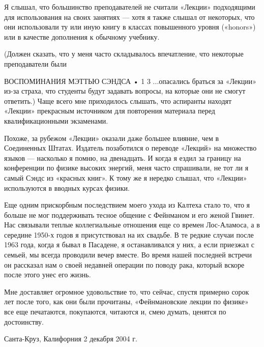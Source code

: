 \documentclass[10pt,oneside]{article}
\begin{document}
Я слышал, что большинство преподавателей не считали «Лекции» подходящими для использования на своих занятиях --- хотя я также слышал от некоторых, что они использовали ту или иную книгу в классах повышенного уровня («honors») или в качестве дополнения к обычному учебнику.\par

(Должен сказать, что у меня часто складывалось впечатление, что некоторые преподаватели были\par

ВОСПОМИНАНИЯ МЭТТЬЮ СЭНДСА • 1 3 ...опасались браться за «Лекции» из-за страха, что студенты будут задавать вопросы, на которые они не смогут ответить.) Чаще всего мне приходилось слышать, что аспиранты находят «Лекции» прекрасным источником для повторения материала перед квалификационными экзаменами.\par

Похоже, за рубежом «Лекции» оказали даже большее влияние, чем в Соединенных Штатах. Издатель позаботился о переводе «Лекций» на множество языков --- насколько я помню, на двенадцать. И когда я ездил за границу на конференции по физике высоких энергий, меня часто спрашивали, не тот ли я самый Сэндс из «красных книг». К тому же я нередко слышал, что «Лекции» используются в вводных курсах физики.\par

Еще одним прискорбным последствием моего ухода из Калтеха стало то, что я больше не мог поддерживать тесное общение с Фейнманом и его женой Гвинет. Нас связывали теплые коллегиальные отношения еще со времен Лос-Аламоса, а в середине 1950-х годов я присутствовал на их свадьбе. В те редкие случаи после 1963 года, когда я бывал в Пасадене, я останавливался у них, а если приезжал с семьей, мы всегда проводили вечер вместе. Во время нашей последней встречи он рассказал нам о своей недавней операции по поводу рака, который вскоре после этого унес его жизнь.\par

Мне доставляет огромное удовольствие то, что сейчас, спустя примерно сорок лет после того, как они были прочитаны, «Фейнмановские лекции по физике» все еще печатаются, покупаются, читаются и, смею думать, ценятся по достоинству.\par

Санта-Круз, Калифорния 2 декабря 2004 г.\par

\clearpage
{}
\end{document}
